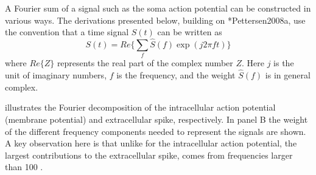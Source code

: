 A Fourier sum of a signal such as the soma action potential can be constructed in various ways. The derivations presented below, building on \citeasnoun**{Pettersen2008a}, use the convention that a time signal $S(t)$ can be written as
\begin{equation}
S(t) = Re \{ \sum_{f}  \hat{S}(f) \exp (j 2 \pi f t) \}
\label{eq:Spikes:Fourier_sum}
\end{equation}
where $Re\{Z\}$ represents the real part of the complex number $Z$.  
Here $j$ is the unit of imaginary numbers, $f$ is the frequency, and the weight $\hat{S}(f)$ is in general complex. 

 illustrates the Fourier decomposition of the intracellular action potential 
(membrane potential) and extracellular spike, respectively. 
In panel B the weight of the different frequency components needed to represent the signals are shown. 
A key observation here is that unlike for the intracellular action potential, 
the largest contributions to the extracellular spike, 
comes from frequencies larger than 100 .


